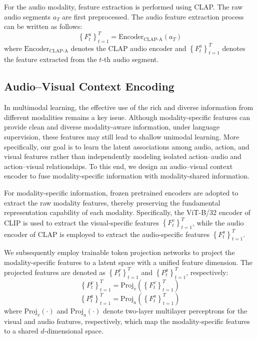 \documentclass[lettersize,journal]{IEEEtran}
\begin{document}
For the audio modality, feature extraction is performed using CLAP. The raw audio segments $a_T$ are first preprocessed. The audio feature extraction process can be written as follows:
\begin{equation}
\left\{ F_t^a \right\}_{t=1}^T = \text{Encoder}_\text{CLAP-A}\left( a_T \right)
\end{equation}
where $\text{Encoder}_\text{CLAP-A}$ denotes the CLAP audio encoder and $\left\{ F_t^a \right\}_{t=1}^T$ denotes the feature extracted from the $t$-th audio segment.

\subsection{Audio–Visual Context Encoding}
In multimodal learning, the effective use of the rich and diverse information from different modalities remains a key issue. Although modality-specific features can provide clean and diverse modality-aware information, under language supervision, these features may still lead to shallow unimodal learning. More specifically, our goal is to learn the latent associations among audio, action, and visual features rather than independently modeling isolated action–audio and action–visual relationships. To this end, we design an audio–visual context encoder to fuse modality-specific information with modality-shared information.


For modality-specific information, frozen pretrained encoders are adopted to extract the raw modality features, thereby preserving the fundamental representation capability of each modality. Specifically, the ViT-B/32 encoder of CLIP is used to extract the visual-specific features $\left\{ F_t^v \right\}_{t=1}^T$, while the audio encoder of CLAP is employed to extract the audio-specific features $\left\{ F_t^a \right\}_{t=1}^T$.


We subsequently employ trainable token projection networks to project the modality-specific features to a latent space with a unified feature dimension. The projected features are denoted as $\left\{ P_t^v \right\}_{t=1}^T$ and $\left\{ P_t^a \right\}_{t=1}^T$, respectively:
\begin{equation}
\left\{ P_t^v \right\}_{t=1}^T = \text{Proj}_v \left( \left\{ F_t^v \right\}_{t=1}^T \right)
\end{equation}
\begin{equation}
\left\{ P_t^a \right\}_{t=1}^T = \text{Proj}_a \left( \left\{ F_t^a \right\}_{t=1}^T \right)
\end{equation}
where $\text{Proj}_v(\cdot)$ and $\text{Proj}_a(\cdot)$ denote two-layer multilayer perceptrons for the visual and audio features, respectively, which map the modality-specific features to a shared $d$-dimensional space.
\end{document}
